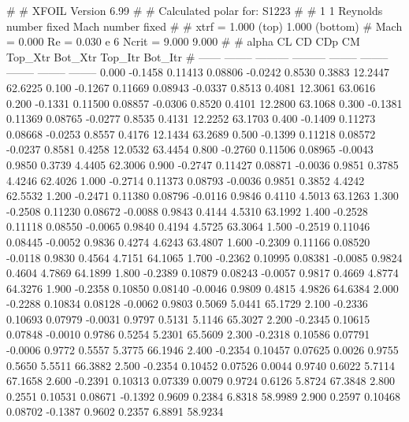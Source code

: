 #  
#       XFOIL         Version 6.99
#  
# Calculated polar for: S1223                                           
#  
# 1 1 Reynolds number fixed          Mach number fixed         
#  
# xtrf =   1.000 (top)        1.000 (bottom)  
# Mach =   0.000     Re =     0.030 e 6     Ncrit =   9.000  9.000
#  
#   alpha    CL        CD       CDp       CM     Top_Xtr  Bot_Xtr  Top_Itr  Bot_Itr
#  ------ -------- --------- --------- -------- -------- -------- -------- --------
   0.000  -0.1458   0.11413   0.08806  -0.0242   0.8530   0.3883  12.2447  62.6225
   0.100  -0.1267   0.11669   0.08943  -0.0337   0.8513   0.4081  12.3061  63.0616
   0.200  -0.1331   0.11500   0.08857  -0.0306   0.8520   0.4101  12.2800  63.1068
   0.300  -0.1381   0.11369   0.08765  -0.0277   0.8535   0.4131  12.2252  63.1703
   0.400  -0.1409   0.11273   0.08668  -0.0253   0.8557   0.4176  12.1434  63.2689
   0.500  -0.1399   0.11218   0.08572  -0.0237   0.8581   0.4258  12.0532  63.4454
   0.800  -0.2760   0.11506   0.08965  -0.0043   0.9850   0.3739   4.4405  62.3006
   0.900  -0.2747   0.11427   0.08871  -0.0036   0.9851   0.3785   4.4246  62.4026
   1.000  -0.2714   0.11373   0.08793  -0.0036   0.9851   0.3852   4.4242  62.5532
   1.200  -0.2471   0.11380   0.08796  -0.0116   0.9846   0.4110   4.5013  63.1263
   1.300  -0.2508   0.11230   0.08672  -0.0088   0.9843   0.4144   4.5310  63.1992
   1.400  -0.2528   0.11118   0.08550  -0.0065   0.9840   0.4194   4.5725  63.3064
   1.500  -0.2519   0.11046   0.08445  -0.0052   0.9836   0.4274   4.6243  63.4807
   1.600  -0.2309   0.11166   0.08520  -0.0118   0.9830   0.4564   4.7151  64.1065
   1.700  -0.2362   0.10995   0.08381  -0.0085   0.9824   0.4604   4.7869  64.1899
   1.800  -0.2389   0.10879   0.08243  -0.0057   0.9817   0.4669   4.8774  64.3276
   1.900  -0.2358   0.10850   0.08140  -0.0046   0.9809   0.4815   4.9826  64.6384
   2.000  -0.2288   0.10834   0.08128  -0.0062   0.9803   0.5069   5.0441  65.1729
   2.100  -0.2336   0.10693   0.07979  -0.0031   0.9797   0.5131   5.1146  65.3027
   2.200  -0.2345   0.10615   0.07848  -0.0010   0.9786   0.5254   5.2301  65.5609
   2.300  -0.2318   0.10586   0.07791  -0.0006   0.9772   0.5557   5.3775  66.1946
   2.400  -0.2354   0.10457   0.07625   0.0026   0.9755   0.5650   5.5511  66.3882
   2.500  -0.2354   0.10452   0.07526   0.0044   0.9740   0.6022   5.7114  67.1658
   2.600  -0.2391   0.10313   0.07339   0.0079   0.9724   0.6126   5.8724  67.3848
   2.800   0.2551   0.10531   0.08671  -0.1392   0.9609   0.2384   6.8318  58.9989
   2.900   0.2597   0.10468   0.08702  -0.1387   0.9602   0.2357   6.8891  58.9234
